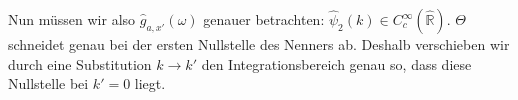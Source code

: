 
Nun müssen wir also $\hat g_{a,x'}(\omega)$ genauer betrachten: $\hat\psi_2(k) \in C^\infty_c(\mathbb{\hat R})$. $\Theta$ schneidet genau bei der ersten Nullstelle des Nenners ab. Deshalb verschieben wir durch eine Substitution $k \rightarrow k'$ den Integrationsbereich genau so, dass diese Nullstelle bei $k' = 0$ liegt.


